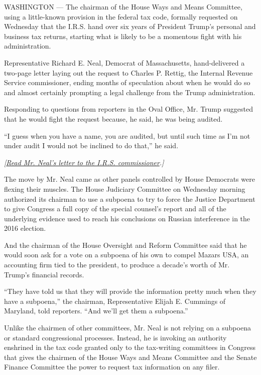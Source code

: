 WASHINGTON --- The chairman of the House Ways and Means Committee, using
a little-known provision in the federal tax code, formally requested on
Wednesday that the I.R.S. hand over six years of President Trump's
personal and business tax returns, starting what is likely to be a
momentous fight with his administration.

Representative Richard E. Neal, Democrat of Massachusetts,
hand-delivered a two-page letter laying out the request to Charles P.
Rettig, the Internal Revenue Service commissioner, ending months of
speculation about when he would do so and almost certainly prompting a
legal challenge from the Trump administration.

Responding to questions from reporters in the Oval Office, Mr. Trump
suggested that he would fight the request because, he said, he was being
audited.

``I guess when you have a name, you are audited, but until such time as
I'm not under audit I would not be inclined to do that,'' he said.

\emph{{[}}\href{https://int.graylady3jvrrxbe.onion/data/documenthelper/740-congress-request-trump-tax-returns/8fca455b44e383714434/optimized/full.pdf\#page=1}{\emph{Read
Mr. Neal's letter to the I.R.S. commissioner}}\emph{.{]}}

The move by Mr. Neal came as other panels controlled by House Democrats
were flexing their muscles. The House Judiciary Committee on Wednesday
morning authorized its chairman to use a subpoena to try to force the
Justice Department to give Congress a full copy of the special counsel's
report and all of the underlying evidence used to reach his conclusions
on Russian interference in the 2016 election.

And the chairman of the House Oversight and Reform Committee said that
he would soon ask for a vote on a subpoena of his own to compel Mazars
USA, an accounting firm tied to the president, to produce a decade's
worth of Mr. Trump's financial records.

``They have told us that they will provide the information pretty much
when they have a subpoena,'' the chairman, Representative Elijah E.
Cummings of Maryland, told reporters. ``And we'll get them a subpoena.''

Unlike the chairmen of other committees, Mr. Neal is not relying on a
subpoena or standard congressional processes. Instead, he is invoking an
authority enshrined in the tax code granted only to the tax-writing
committees in Congress that gives the chairmen of the House Ways and
Means Committee and the Senate Finance Committee the power to request
tax information on any filer.

